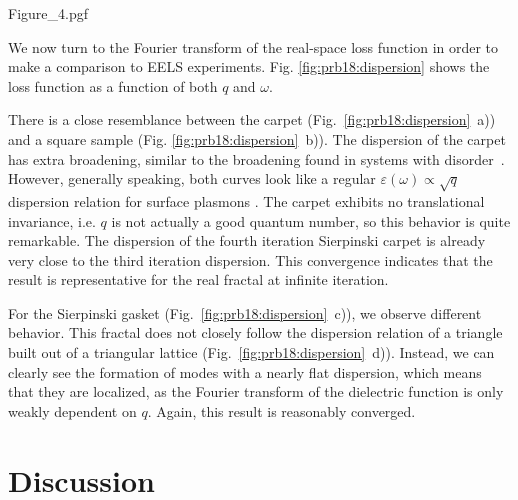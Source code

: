 \begin{figure*}[t]
    \centering
    {Figure_4.pgf}
    \caption{Dispersion relation $\;-\operatorname{Im}[1 / \langle\mathbf{q}| \hat\varepsilon(\omega) |\mathbf{q}\rangle]$, showing the frequency and momentum dependency of the loss function. Momentum was taken along the $x$--axis. a) A square built out of square lattice as compared to b) the fourth iteration Sierpinski carpet. Similarly, c) a triangle built out of triangular lattice as compared to d) a sixth iteration Sierpinski gasket. The maximum of the left hand side is plotted as a dashed white line on the right hand side.}
    \label{fig:prb18:dispersion}
\end{figure*}

We now turn to the Fourier transform of the real-space loss function in order to make a comparison to EELS experiments. Fig. \ref{fig:prb18:dispersion} shows the loss function as a function of both $q$ and $\omega$.

There is a close resemblance between the carpet (Fig.~\ref{fig:prb18:dispersion}~a)) and a square sample (Fig. \ref{fig:prb18:dispersion}~b)). The dispersion of the carpet has extra broadening, similar to the broadening found in systems with disorder~\cite{jin_screening_2015}. However, generally speaking, both curves look like a regular $\varepsilon(\omega) \propto \sqrt{q}$ dispersion relation for surface plasmons \cite{giuliani2005quantum}. The carpet exhibits no translational invariance, i.e. $q$ is not actually a good quantum number, so this behavior is quite remarkable. The dispersion of the fourth iteration Sierpinski carpet is already very close to the third iteration dispersion. This convergence indicates that the result is representative for the real fractal at infinite iteration.

For the Sierpinski gasket (Fig.~\ref{fig:prb18:dispersion}~c)), we observe different behavior. This fractal does not closely follow the dispersion relation of a triangle built out of a triangular lattice (Fig.~\ref{fig:prb18:dispersion}~d)).  Instead, we can clearly see the formation of modes with a nearly flat dispersion, which means that they are localized, as the Fourier transform of the dielectric function is only weakly dependent on $q$. Again, this result is reasonably converged.

\section{Discussion}

